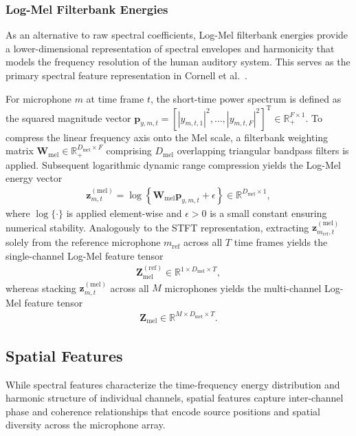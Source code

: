 \documentclass[lettersize,journal]{IEEEtran}
\begin{document}
\subsubsection{Log-Mel Filterbank Energies}
\label{sec:feat_logmel}
As an alternative to raw spectral coefficients, Log-Mel filterbank energies provide a lower-dimensional representation of spectral envelopes and harmonicity that models the frequency resolution of the human auditory system. This serves as the primary spectral feature representation in Cornell et al.~\cite{cornell2022overlapped}.

For microphone $m$ at time frame $t$, the short-time power spectrum is defined as the squared magnitude vector $\mathbf{p}_{y,m,t} = [|y_{m,t,1}|^2, \ldots, |y_{m,t,F}|^2]^{\mathrm{T}} \in \mathbb{R}_{+}^{F \times 1}$. To compress the linear frequency axis onto the Mel scale, a filterbank weighting matrix $\mathbf{W}_{\mathrm{mel}} \in \mathbb{R}_{+}^{D_{\mathrm{mel}} \times F}$ comprising $D_{\mathrm{mel}}$ overlapping triangular bandpass filters is applied. Subsequent logarithmic dynamic range compression yields the Log-Mel energy vector
\begin{align}
  \mathbf{z}_{m,t}^{(\mathrm{mel})} = \log\left\{ \mathbf{W}_{\mathrm{mel}} \mathbf{p}_{y,m,t} + \epsilon \right\} \in \mathbb{R}^{D_{\mathrm{mel}} \times 1},
  \label{eq:feat_logmel_vec}
\end{align}
where $\log\{\cdot\}$ is applied element-wise and $\epsilon > 0$ is a small constant ensuring numerical stability. Analogously to the \gls{STFT} representation, extracting $\mathbf{z}_{m_{\mathrm{ref}},t}^{(\mathrm{mel})}$ solely from the reference microphone $m_{\mathrm{ref}}$ across all $T$ time frames yields the single-channel Log-Mel feature tensor
\begin{align}
  \mathbf{Z}_{\mathrm{mel}}^{(\mathrm{ref})} \in \mathbb{R}^{1 \times D_{\mathrm{mel}} \times T},
  \label{eq:feat_logmel_ref_tensor}
\end{align}
whereas stacking $\mathbf{z}_{m,t}^{(\mathrm{mel})}$ across all $M$ microphones yields the multi-channel Log-Mel feature tensor
\begin{align}
  \mathbf{Z}_{\mathrm{mel}} \in \mathbb{R}^{M \times D_{\mathrm{mel}} \times T}.
  \label{eq:feat_logmel_tensor}
\end{align}

\subsection{Spatial Features}
\label{sec:feat_spatial}
While spectral features characterize the time-frequency energy distribution and harmonic structure of individual channels, spatial features capture inter-channel phase and coherence relationships that encode source positions and spatial diversity across the microphone array.
\end{document}
